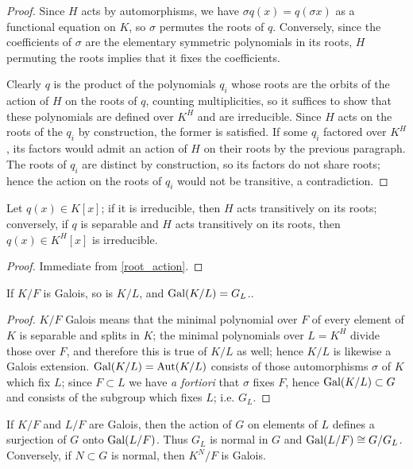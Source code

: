 \begin{proof} Since $H$ acts by automorphisms, we have $\sigma q(x) = q(\sigma
x)$ as a functional equation on $K$, so $\sigma$ permutes the roots of $q$.
Conversely, since the coefficients of $\sigma$ are the elementary symmetric
polynomials in its roots, $H$ permuting the roots implies that it fixes the
coefficients.

Clearly $q$ is the product of the polynomials $q_i$ whose roots are the orbits
of the action of $H$ on the roots of $q$, counting multiplicities, so it
suffices to show that these polynomials are defined over $K^H$ and are
irreducible.  Since $H$ acts on the roots of the $q_i$ by construction, the
former is satisfied.  If some $q_i$ factored over $K^H$, its factors would
admit an action of $H$ on their roots by the previous paragraph.  The roots of
$q_i$ are distinct by construction, so its factors do not share roots; hence
the action on the roots of $q_i$ would not be transitive, a contradiction.
\end{proof}

\begin{corollary} Let $q(x) \in K[x]$; if it is irreducible, then $H$ acts
transitively on its roots; conversely, if $q$ is separable and $H$ acts
transitively on its roots, then $q(x) \in K^H[x]$ is irreducible.
\label{sep_irred}
\end{corollary}

\begin{proof} Immediate from \ref{root_action}. \end{proof}

\begin{lemma} If $K/F$ is Galois, so is $K/L$, and $\operatorname{\text{Gal}}(K/L) = G_L$..
\label{sub_galois}
\end{lemma}

\begin{proof} $K/F$ Galois means that the minimal polynomial over $F$ of every
element of $K$ is separable and splits in $K$; the minimal polynomials over $L
= K^H$ divide those over $F$, and therefore this is true of $K/L$ as well;
hence $K/L$ is likewise a Galois extension. $\operatorname{\text{Gal}}(K/L) = \operatorname{\text{Aut}}(K/L)$ consists
of those automorphisms $\sigma$ of $K$ which fix $L$; since $F \subset L$ we
have \emph{a fortiori} that $\sigma$ fixes $F$, hence $\operatorname{\text{Gal}}(K/L) \subset G$
and consists of the subgroup which fixes $L$; i.e. $G_L$. \end{proof}

\begin{corollary} If $K/F$ and $L/F$ are Galois, then the action of $G$ on elements of $L$
defines a surjection of $G$ onto $\operatorname{\text{Gal}}(L/F)$.  Thus $G_L$ is normal in $G$ and $\operatorname{\text{Gal}}(L/F) \cong G/G_L$.  Conversely, if $N \subset G$ is normal, then $K^N/F$ is Galois.
\label{normal}
\end{corollary}

